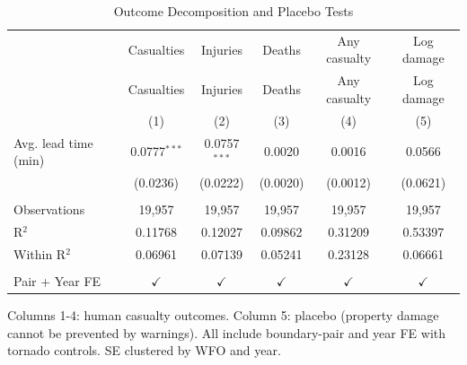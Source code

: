 
\begin{table}[htbp]
   \caption{\label{tab:outcomes} Outcome Decomposition and Placebo Tests}
   \bigskip
   \centering
   \begin{tabular}{lccccc}
      \toprule
                           & Casualties     & Injuries       & Deaths        & Any casualty  & Log damage\\  
                           & Casualties     & Injuries       & Deaths        & Any casualty  & Log damage \\   
                           & (1)            & (2)            & (3)           & (4)           & (5)\\  
      \midrule 
      Avg. lead time (min) & 0.0777$^{***}$ & 0.0757$^{***}$ & 0.0020        & 0.0016        & 0.0566\\   
                           & (0.0236)       & (0.0222)       & (0.0020)      & (0.0012)      & (0.0621)\\   
       \\
      Observations         & 19,957         & 19,957         & 19,957        & 19,957        & 19,957\\  
      R$^2$                & 0.11768        & 0.12027        & 0.09862       & 0.31209       & 0.53397\\  
      Within R$^2$         & 0.06961        & 0.07139        & 0.05241       & 0.23128       & 0.06661\\  
       \\
      Pair + Year FE       & $\checkmark$   & $\checkmark$   & $\checkmark$  & $\checkmark$  & $\checkmark$\\   
      \bottomrule
   \end{tabular}
   
   \par \raggedright 
   Columns 1-4: human casualty outcomes. Column 5: placebo (property damage cannot be prevented by warnings). All include boundary-pair and year FE with tornado controls. SE clustered by WFO and year.
\end{table}


